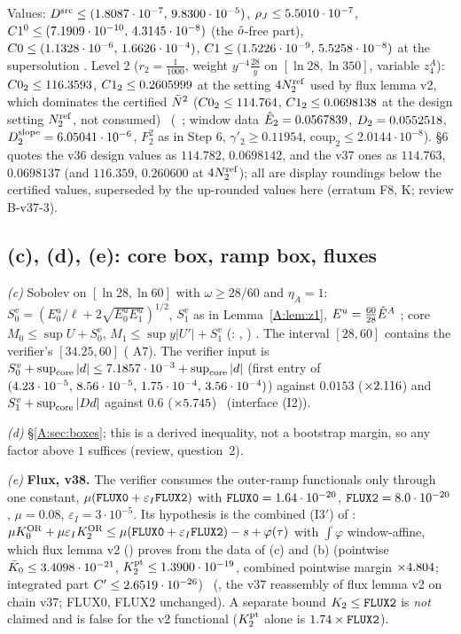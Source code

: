 \documentclass[11pt]{article}
\begin{document}
\noindent Values: $D^{\rm src}\le(1.8087\cdot10^{-7},\,9.8300\cdot10^{-5})$, $\rho_J\le5.5010\cdot10^{-7}$, $C1^0\le(7.1909\cdot10^{-10},\,4.3145\cdot10^{-8})$ (the $\hat o$-free part), $C0\le(1.1328\cdot10^{-6},\,1.6626\cdot10^{-4})$, $C1\le(1.5226\cdot10^{-9},\,5.5258\cdot10^{-8})$ at the supersolution \tC\tB. Level 2 ($r_2=\frac1{1000}$, weight $y^{-4}\frac{28}y$ on $[\ln28,\ln350]$, variable $z^A_4$): $C0_2\le116.3593$, $C1_2\le0.2605999$ at the setting $4N_2^{\rm ref}$ used by flux lemma v2, which dominates the certified $\bar N^2$ ($C0_2\le114.764$, $C1_2\le0.0698138$ at the design setting $N_2^{\rm ref}$, not consumed) \tC\ (\SA\ ; window data $\hat E_2=0.0567839$, $D_2=0.0552518$, $D_2^{\rm slope}=6.05041\cdot10^{-6}$, $F_2^2$ as in Step 6, $\gamma'_2\ge0.11954$, $\mathrm{coup}_2\le2.0144\cdot10^{-8}$).  \S6 quotes the v36 design values as $114.782$, $0.0698142$, and  the v37 ones as $114.763$, $0.0698137$ (and $116.359$, $0.260600$ at $4N_2^{\rm ref}$); all are display roundings below the certified values, superseded by the up-rounded values here (erratum F8, K; review B-v37-3).

\subsection{(c), (d), (e): core box, ramp box, fluxes}
\emph{(c)} Sobolev on $[\ln28,\ln60]$ with $\omega\ge28/60$ and $\eta_A=1$: $S^v_0=(E^u_0/\ell+2\sqrt{E^u_0E^u_1})^{1/2}$, $S^v_1$ as in Lemma~\ref{A:lem:z1}, $E^u=\frac{60}{28}\hat E^A$ \tP; core $M_0\le\sup U+S^v_0$, $M_1\le\sup y|U'|+S^v_1$ (: , ) \tC. The interval $[28,60]$ contains the verifier's $[34.25,60]$ ( A7). The verifier input is $S^v_0+\sup_{\rm core}|d|\le7.1857\cdot10^{-3}+\sup_{\rm core}|d|$ (first entry of $(4.23\cdot10^{-5},\,8.56\cdot10^{-5},\,1.75\cdot10^{-4},\,3.56\cdot10^{-4})$) against $0.0153$ ($\times2.116$) and $S^v_1+\sup_{\rm core}|Dd|$ against $0.6$ ($\times5.745$) \tC\tB\ (interface (I2)).

\emph{(d)} \S\ref{A:sec:boxes}; this is a derived inequality, not a bootstrap margin, so any factor above $1$ suffices (review, question~2).

\emph{(e)} \textbf{Flux, v38.} The verifier  consumes the outer-ramp functionals only through one constant, $\mu(\fn{FLUX0}+\varepsilon_I\fn{FLUX2})$ with $\fn{FLUX0}=1.64\cdot10^{-20}$, $\fn{FLUX2}=8.0\cdot10^{-20}$, $\mu=0.08$, $\varepsilon_I=3\cdot10^{-5}$. Its hypothesis is the combined (I3$'$) of : $\mu K_0^{\rm OR}+\mu\varepsilon_IK_2^{\rm OR}\le\mu(\fn{FLUX0}+\varepsilon_I\fn{FLUX2})-s+\varphi(\tau)$ with $\int\varphi$ window-affine, which flux lemma v2 () proves from the data of (c) and (b) (pointwise $\bar K_0\le3.4098\cdot10^{-21}$, $K_2^{\rm pt}\le1.3900\cdot10^{-19}$, combined pointwise margin $\times4.804$; integrated part $C'\le2.6519\cdot10^{-26}$) \tC\ (, the v37 reassembly of flux lemma v2 on chain v37; FLUX0, FLUX2 unchanged). A separate bound $K_2\le\fn{FLUX2}$ is \emph{not} claimed and is false for the v2 functional ($K_2^{\rm pt}$ alone is $1.74\times\fn{FLUX2}$).
\end{document}
